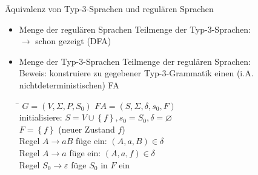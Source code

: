 \begin{frame}{Äquivalenz von Typ-3-Sprachen und regulären Sprachen}
	\begin{itemize}
		\item Menge der regulären Sprachen Teilmenge der Typ-3-Sprachen:\\
		\quad $\rightarrow$ schon gezeigt (DFA)
		\item Menge der Typ-3-Sprachen Teilmenge der regulären Sprachen:\\
		Beweis: konstruiere zu gegebener Typ-3-Grammatik einen (i.A. nichtdeterministischen) FA\\
		\begin{tabbing}
			\hspace{5cm}\=\kill
		$G=(V,\Sigma, P, S_0)$	\> $FA=(S, \Sigma, \delta, s_0, F)$\\ 
			\> initialisiere: $S=V \cup \left\{f\right\}, s_0=S_0, \delta=\varnothing$\\ 
			\> $F=\left\{f\right\}$ (neuer Zustand $f$)\\ 
		Regel $A \rightarrow aB$	\> füge ein: $(A, a, B) \in \delta$\\ 
		Regel $A \rightarrow a$	\> füge ein: $(A, a, f) \in \delta$\\ 
		Regel $S_0 \rightarrow \varepsilon$	\> füge $S_0$ in $F$ ein
		\end{tabbing} 
	\end{itemize}
\end{frame}


